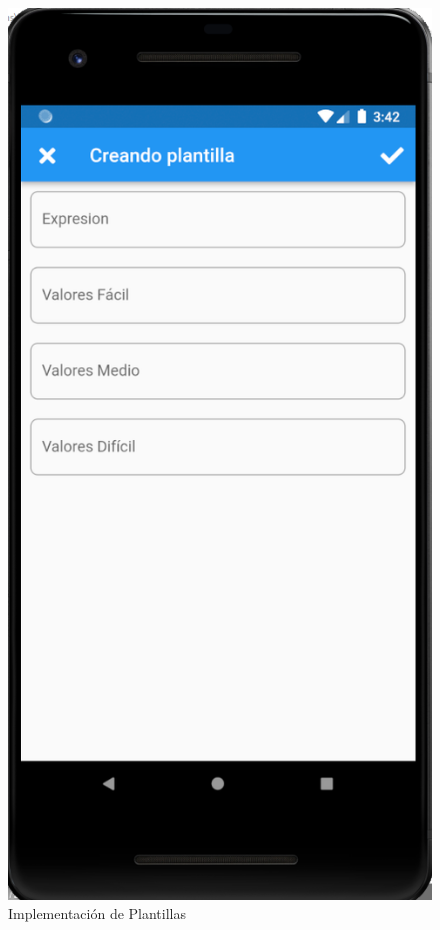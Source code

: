 \documentclass{article}
\begin{document}
\begin{figure}[H]
    \centering
    \includegraphics[scale=0.8]{imgs/Imp/Plantillas2}
    \caption{Implementación de Plantillas}
    \label{fig:implementacion_07}
\end{figure}
\end{document}
